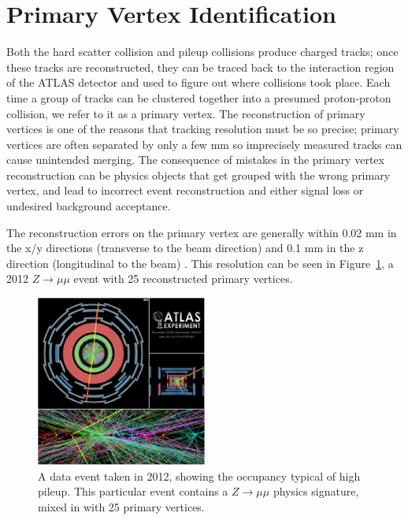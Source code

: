 \section{Primary Vertex Identification}
\label{sec:pv}
Both the hard scatter collision and pileup collisions produce charged tracks; once these tracks are reconstructed, they can 
be traced back to the interaction region of the ATLAS detector and used to figure out where collisions took place.  
Each time a group of tracks can be clustered together into a presumed proton-proton collision, we refer to it 
as a primary vertex.  The reconstruction of primary vertices is one of the reasons that tracking resolution must be 
so precise; primary vertices are often separated by only a few mm so imprecisely measured tracks can cause unintended 
merging.  The consequence of mistakes in the primary vertex reconstruction can be physics objects that get grouped with the 
wrong primary vertex, and lead to incorrect event reconstruction and either signal loss or undesired background acceptance.

The reconstruction errors on the primary vertex are generally within 0.02 mm in the x/y directions 
(transverse to the beam direction) and 0.1 mm in the z direction (longitudinal to the  
beam) \cite{pileup_tracks}.   This resolution can be seen in Figure~\ref{fig:pileup_pv}, a 2012 
$Z\rightarrow\mu\mu$ event with 25 reconstructed primary vertices.



\begin{figure}
    \center
	\includegraphics[width=0.5\textwidth]{ReconstructionPerformance/images/2012_highPileup.pdf}
	\caption{A data event taken in 2012, showing the occupancy typical of high pileup.  This particular event contains a $Z\rightarrow \mu\mu$ physics signature, mixed in with 25 primary vertices.	\label{fig:pileup_pv}  }
\end{figure}


